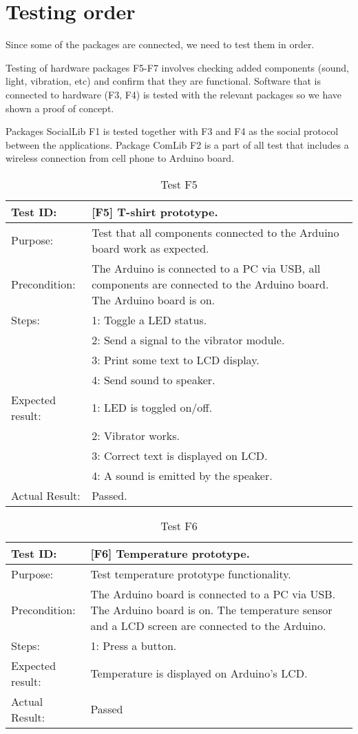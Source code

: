 \section{Testing order}
Since some of the packages are connected, we need to test them in order.

Testing of hardware packages F5-F7 involves checking added components (sound,
light, vibration, etc) and confirm that they are functional. Software that is
connected to hardware (F3, F4) is tested with the relevant packages so we have
shown a proof of concept.

Packages SocialLib F1 is tested together with F3 and F4 as the social protocol
between the applications. Package ComLib F2 is a part of all test that includes
a wireless connection from cell phone to Arduino board.

\begin{table}[h!]
\begin{tabular}{|l|p{10cm}|}
\hline Test ID: &		[F5] T-shirt prototype. \\
\hline Purpose: &		Test that all components connected to the Arduino board
						work as expected. \\
\hline Precondition: &	The Arduino is connected to a PC via USB, all components
						are connected to the Arduino board. The Arduino board is
						on.\\
\hline
Steps:
 & 1: Toggle a LED status. \\
 & 2: Send a signal to the vibrator module. \\
 & 3: Print some text to LCD display. \\
 & 4: Send sound to speaker.\\
\hline
Expected result:
 & 1: LED is toggled on/off.\\
 & 2: Vibrator works. \\ 
 & 3: Correct text is displayed on LCD. \\ 
 & 4: A sound is emitted by the speaker. \\
\hline
Actual Result:
 & Passed. \\
\hline
\end{tabular}
\caption{Test F5}
\label{tbl:f5test}
\end{table}

\begin{table}[h!]
\begin{tabular}{|l|p{10cm}|}
\hline Test ID: &		[F6] Temperature prototype. \\
\hline Purpose: &		Test temperature prototype functionality. \\
\hline Precondition: &	The Arduino board is connected to a PC via USB. The
						Arduino board is on. The temperature sensor and a LCD
						screen are connected to the Arduino.\\
\hline
Steps:
 & 1: Press a button. \\
\hline
Expected result:
 & Temperature is displayed on Arduino's LCD.\\ 
\hline
Actual Result:
 & Passed \\
\hline
\end{tabular}
\caption{Test F6}
\label{tbl:f6test}
\end{table}

